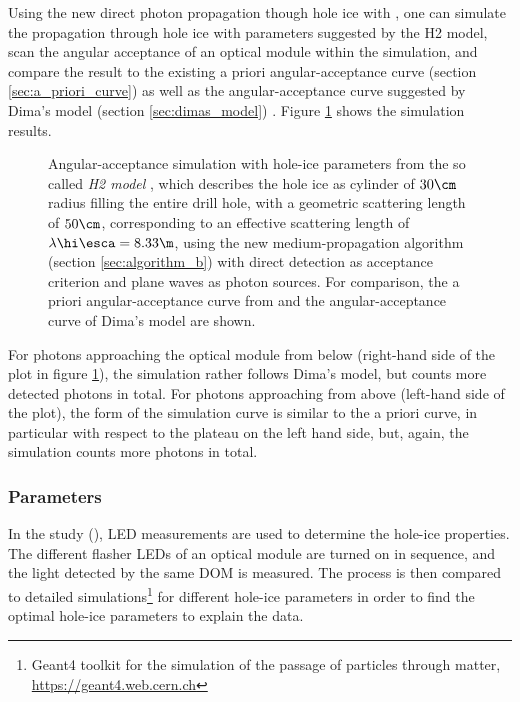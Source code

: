 Using the new direct photon propagation though hole ice with \clsim, one can simulate the propagation through hole ice with parameters suggested by the H2 model, scan the angular acceptance of an optical module within the simulation, and compare the result to the existing a priori angular-acceptance curve (section \ref{sec:a_priori_curve}) \cite{icepaper} as well as the angular-acceptance curve suggested by Dima's model (section \ref{sec:dimas_model}) \cite{flasherdataderivedicemodels}.
Figure \ref{fig:xaeg2Mee} shows the simulation results.


\begin{figure}[htbp]
  \caption{Angular-acceptance simulation with hole-ice parameters from the so called \textit{H2 model} \cite{holeicestudieswithyag}, which describes the hole ice as cylinder of $30\cm$ radius filling the entire drill hole, with a geometric scattering length of $50\cm$, corresponding to an effective scattering length of $\lambda\hi\esca = 8.33\m$, using the new medium-propagation algorithm (section \ref{sec:algorithm_b}) with direct detection as acceptance criterion and plane waves as photon sources. For comparison, the a priori angular-acceptance curve from \cite{icepaper} and the angular-acceptance curve of Dima's model \cite{flasherdataderivedicemodels} are shown.}
  \label{fig:xaeg2Mee}
\end{figure}

For photons approaching the optical module from below (right-hand side of the plot in figure \ref{fig:xaeg2Mee}), the simulation rather follows Dima's model, but counts more detected photons in total. For photons approaching from above (left-hand side of the plot), the form of the simulation curve is similar to the a priori curve, in particular with respect to the plateau on the left hand side, but, again, the simulation counts more photons in total.


\subsubsection{ Parameters}
\label{sec:dard_parameters}

In the  study (), LED measurements are used to determine the hole-ice properties. The different flasher LEDs of an optical module are turned on in sequence, and the light detected by the same DOM is measured. The process is then compared to detailed  simulations\footnote{Geant4 toolkit for the simulation of the passage of particles through matter, \url{https://geant4.web.cern.ch}} for different hole-ice parameters in order to find the optimal hole-ice parameters to explain the data. \cite{martindardupdate, martinspicehddard}

